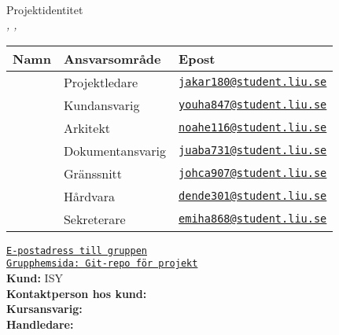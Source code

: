 \documentclass[kravspec/krav.tex]{subfiles}
\newenvironment{projektidentitet}{%
{\ }\vspace{30mm}
\renewcommand{\arraystretch}{2}
\begin{center}
  {\huge Projektidentitet\\[1ex]}
  \textsl{\VARgruppnummer, \LIPSdatum, \VARprojekttitel}\\[1cm]
    \begin{tabular}{lp{60mm}l}
      \hline
      \textbf{Namn} &
      \textbf{Ansvarsområde} &
      \textbf{Epost} \\
	\hline
      }%
      {%
      \hline
    \end{tabular}
\end{center}
}
\newcommand{\gruppmedlem}[3]{{#1} & {#2} & {#3} \\}
\begin{document}
\thispagestyle{empty}

\begin{projektidentitet}
\gruppmedlem{\VARprojektledare}{Projektledare}{\href{mailto:jakar180@student.liu.se}{\texttt{jakar180@student.liu.se}}}
\gruppmedlem{\VARkundansvarig}{Kundansvarig}{\href{mailto:youha847@student.liu.se}{\texttt{youha847@student.liu.se}}}
\gruppmedlem{\VARarkitekt}{Arkitekt}{\href{mailto:noahe116@student.liu.se}{\texttt{noahe116@student.liu.se}}}
\gruppmedlem{\VARdokumentansvarig}{Dokumentansvarig}{\href{mailto:juaba731@student.liu.se}{\texttt{juaba731@student.liu.se}}}

\gruppmedlem{\VARgranssnitt}{Gränssnitt}{\href{mailto:johca907@student.liu.se}{\texttt{johca907@student.liu.se}}}
\gruppmedlem{\VARhardware}{Hårdvara}{\href{mailto:dende301@student.liu.se}{\texttt{dende301@student.liu.se}}}
\gruppmedlem{\VARsekreterare}{Sekreterare}{\href{mailto:emiha868@student.liu.se}{\texttt{emiha868@student.liu.se}}}
\end{projektidentitet}

\begin{center}
\vspace{0.5cm}
{\href{mailto:jakar180@student.liu.se,youha847@student.liu.se,noahe116@student.liu,juaba731@student.liu.se,
    johca907@student.liu.se,dende301@student.liu.se,emiha868@student.liu.se}{
\texttt{E-postadress till gruppen}}}\\

{\href{\VARgrupphemsida}{
\texttt{Grupphemsida: Git-repo för projekt}}}\\[1cm]

{\textbf{Kund:} ISY}\\[0.5ex]
{\textbf{Kontaktperson hos kund:} \VARbestallare}\\[1cm]

{\textbf{Kursansvarig:} \VARkursansvarig}\\[1ex]
{\textbf{Handledare:} \VARhandledare}

\end{center}
\newpage
\end{document}
